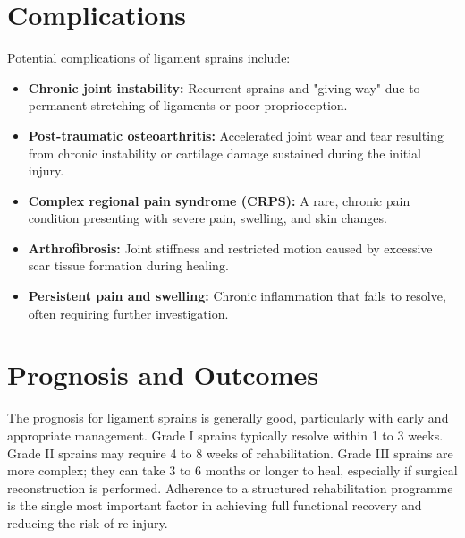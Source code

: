 \section*{Complications}
Potential complications of ligament sprains include:
\begin{itemize}
    \item \textbf{Chronic joint instability:} Recurrent sprains and "giving way" due to permanent stretching of ligaments or poor proprioception.
    \item \textbf{Post-traumatic osteoarthritis:} Accelerated joint wear and tear resulting from chronic instability or cartilage damage sustained during the initial injury.
    \item \textbf{Complex regional pain syndrome (CRPS):} A rare, chronic pain condition presenting with severe pain, swelling, and skin changes.
    \item \textbf{Arthrofibrosis:} Joint stiffness and restricted motion caused by excessive scar tissue formation during healing.
    \item \textbf{Persistent pain and swelling:} Chronic inflammation that fails to resolve, often requiring further investigation.
\end{itemize}

\section*{Prognosis and Outcomes}
The prognosis for ligament sprains is generally good, particularly with early and appropriate management. Grade I sprains typically resolve within 1 to 3 weeks. Grade II sprains may require 4 to 8 weeks of rehabilitation. Grade III sprains are more complex; they can take 3 to 6 months or longer to heal, especially if surgical reconstruction is performed. Adherence to a structured rehabilitation programme is the single most important factor in achieving full functional recovery and reducing the risk of re-injury.

